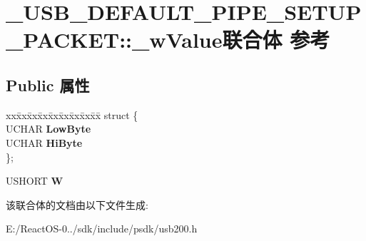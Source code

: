 \hypertarget{union___u_s_b___d_e_f_a_u_l_t___p_i_p_e___s_e_t_u_p___p_a_c_k_e_t_1_1__w_value}{}\section{\+\_\+\+U\+S\+B\+\_\+\+D\+E\+F\+A\+U\+L\+T\+\_\+\+P\+I\+P\+E\+\_\+\+S\+E\+T\+U\+P\+\_\+\+P\+A\+C\+K\+ET\+:\+:\+\_\+w\+Value联合体 参考}
\label{union___u_s_b___d_e_f_a_u_l_t___p_i_p_e___s_e_t_u_p___p_a_c_k_e_t_1_1__w_value}
\subsection*{Public 属性}
\begin{DoxyCompactItemize}
\item 
\mbox{\label{union___u_s_b___d_e_f_a_u_l_t___p_i_p_e___s_e_t_u_p___p_a_c_k_e_t_1_1__w_value_a67b8992a09b0b2606843cf34255c6c39}} 
\begin{tabbing}
xx\=xx\=xx\=xx\=xx\=xx\=xx\=xx\=xx\=\kill
struct \{\\
\>UCHAR {\bfseries LowByte}\\
\>UCHAR {\bfseries HiByte}\\
\}; \\

\end{tabbing}\item 
\mbox{\label{union___u_s_b___d_e_f_a_u_l_t___p_i_p_e___s_e_t_u_p___p_a_c_k_e_t_1_1__w_value_ae24496ae64bab036defdee0f613062df}} 
U\+S\+H\+O\+RT {\bfseries W}
\end{DoxyCompactItemize}


该联合体的文档由以下文件生成\+:\begin{DoxyCompactItemize}
\item 
E\+:/\+React\+O\+S-\/0../sdk/include/psdk/usb200.\+h\end{DoxyCompactItemize}

